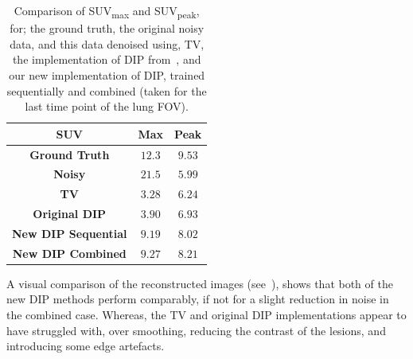     \begin{table}
        
        \centering
        
        \captionsetup{singlelinecheck=false, justification=centering}
        \caption{
        Comparison of \acrshort{SUV}\textsubscript{max} and \acrshort{SUV}\textsubscript{peak}, for; the ground truth, the original noisy data, and this data denoised using, \gls{TV}, the implementation of \gls{DIP} from~\cite{Gong2019PETPrior}, and our new implementation of \gls{DIP}, trained sequentially and combined (taken for the last time point of the lung \gls{FOV}).}
        
        
        \resizebox*{1.0\linewidth}{!}
        {
            \begin{tabular}{||c|cc||}
                \hline
                \textbf{\acrshort{SUV}}             & \textbf{Max}  & \textbf{Peak} \\
                \hline
                \textbf{Ground Truth}               & $12.3$        & $9.53$ \\
                \hline
                \textbf{Noisy}                      & $21.5$        & $5.99$ \\
                \hline
                \textbf{\gls{TV}}                   & $3.28$        & $6.24$ \\
                \textbf{Original \gls{DIP}}         & $3.90$        & $6.93$ \\
                \hline
                \textbf{New \gls{DIP} Sequential}   & $9.19$        & $8.02$ \\
                \textbf{New \gls{DIP} Combined}     & $9.27$        & $8.21$ \\
                \hline
            \end{tabular}
        }
        \label{tab:suv}
        
    \end{table}
    
    A visual comparison of the reconstructed images (see~), shows that both of the new \gls{DIP} methods perform comparably, if not for a slight reduction in noise in the combined case. Whereas, the \gls{TV} and original \gls{DIP} implementations appear to have struggled with, over smoothing, reducing the contrast of the lesions, and introducing some edge artefacts.
    
